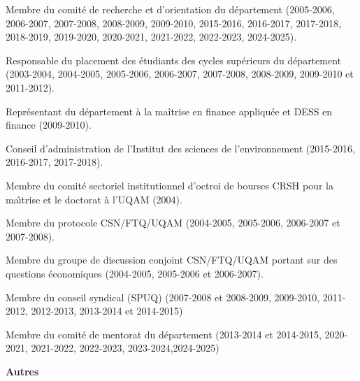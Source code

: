 \begin{description}
\item Membre du comit\'e de recherche et d'orientation du
d\'epartement (2005-2006, 2006-2007, 2007-2008, 2008-2009, 2009-2010, 2015-2016, 2016-2017, 2017-2018, 2018-2019, 2019-2020, 2020-2021, 2021-2022, 2022-2023, 2024-2025).

\item Responsable du placement des \'etudiants des cycles
sup\'erieurs du d\'epartement (2003-2004, 2004-2005, 2005-2006, 2006-2007, 2007-2008, 2008-2009, 2009-2010 et 2011-2012).

\item Repr\'esentant du d\'epartement \`a la ma\^itrise en finance appliqu\'ee et DESS en finance (2009-2010).

\item Conseil d'administration de l'Institut des sciences de
l'environnement (2015-2016, 2016-2017, 2017-2018).

\item Membre du comit\'e sectoriel institutionnel d'octroi de bourses CRSH pour la ma\^{\i}trise
et le doctorat \`a l'UQAM (2004).


\item Membre du protocole CSN/FTQ/UQAM (2004-2005, 2005-2006,
2006-2007 et 2007-2008).

\item Membre du groupe de discussion conjoint CSN/FTQ/UQAM  portant sur des questions \'economiques (2004-2005, 2005-2006 et
2006-2007).

\item Membre du conseil syndical (SPUQ) (2007-2008 et 2008-2009, 2009-2010, 2011-2012, 2012-2013, 2013-2014 et 2014-2015)

\item Membre du comit\'e de mentorat du d\'epartement (2013-2014 et 2014-2015, 2020-2021, 2021-2022, 2022-2023, 2023-2024,2024-2025)
\end{description}



\vspace{.3cm}




\vspace{1cm} \centerline{\bf Autres}

\vspace{.3cm}

